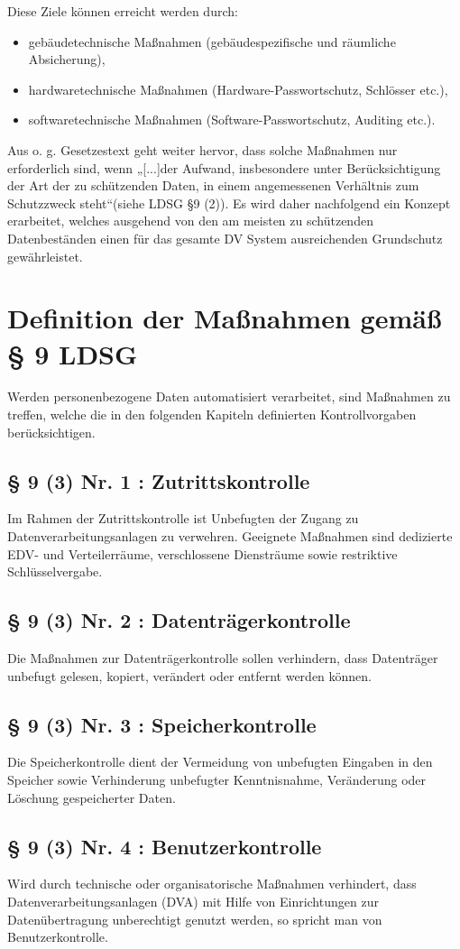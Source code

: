 \documentclass[]{scrreprt}
\begin{document}
\noindent
Diese Ziele können erreicht werden durch:
\begin{itemize}
	\item gebäudetechnische Maßnahmen (gebäudespezifische und räumliche Absicherung),
	\item hardwaretechnische Maßnahmen (Hardware-Passwortschutz, Schlösser etc.),
	\item softwaretechnische Maßnahmen (Software-Passwortschutz, Auditing etc.).
\end{itemize}

Aus o. g. Gesetzestext geht weiter hervor, dass solche Maßnahmen nur erforderlich sind, wenn „[...]der Aufwand, insbesondere unter Berücksichtigung der Art der zu schützenden Daten, in einem angemessenen Verhältnis zum Schutzzweck steht“(siehe LDSG §9 (2)).
Es wird daher nachfolgend ein Konzept erarbeitet, welches ausgehend von den am meisten zu schützenden Datenbeständen einen für das gesamte DV System ausreichenden Grundschutz gewährleistet.


\section{Definition der Maßnahmen gemäß § 9 LDSG}
Werden personenbezogene Daten automatisiert verarbeitet, sind Maßnahmen zu treffen, welche die in den folgenden Kapiteln definierten Kontrollvorgaben berücksichtigen.
\subsection{§ 9 (3) Nr. 1 : Zutrittskontrolle}
Im Rahmen der Zutrittskontrolle ist Unbefugten der Zugang zu Datenverarbeitungsanlagen zu verwehren. Geeignete Maßnahmen sind dedizierte EDV- und Verteilerräume, verschlossene Diensträume sowie restriktive Schlüsselvergabe.
\subsection{§ 9 (3) Nr. 2 : Datenträgerkontrolle}
Die Maßnahmen zur Datenträgerkontrolle sollen verhindern, dass Datenträger unbefugt gelesen, kopiert, verändert oder entfernt werden können.
\subsection{§ 9 (3) Nr. 3 : Speicherkontrolle}
Die Speicherkontrolle dient der Vermeidung von unbefugten Eingaben in den Speicher sowie Verhinderung unbefugter Kenntnisnahme, Veränderung oder Löschung gespeicherter Daten.
\subsection{§ 9 (3) Nr. 4 : Benutzerkontrolle}
Wird durch technische oder organisatorische Maßnahmen verhindert, dass Datenverarbeitungsanlagen (DVA) mit Hilfe von Einrichtungen zur Datenübertragung unberechtigt genutzt werden, so spricht man von Benutzerkontrolle.
\end{document}
